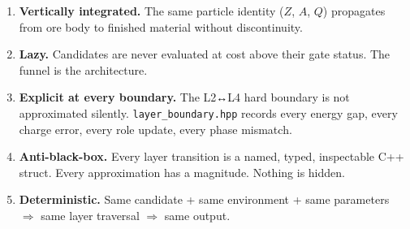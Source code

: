 \documentclass[11pt, a4paper, oneside]{article}
\theoremstyle{definition}
\newcommand{\file}[1]{\texttt{#1}}
\begin{document}
\begin{enumerate}
  \item \textbf{Vertically integrated.}
        The same particle identity ($Z$, $A$, $Q$) propagates from
        ore body to finished material without discontinuity.

  \item \textbf{Lazy.}
        Candidates are never evaluated at cost above their gate status.
        The funnel is the architecture.

  \item \textbf{Explicit at every boundary.}
        The L2↔L4 hard boundary is not approximated silently.
        \file{layer\_boundary.hpp} records every energy gap, every
        charge error, every role update, every phase mismatch.

  \item \textbf{Anti-black-box.}
        Every layer transition is a named, typed, inspectable C++ struct.
        Every approximation has a magnitude.  Nothing is hidden.

  \item \textbf{Deterministic.}
        Same candidate + same environment + same parameters
        $\Rightarrow$ same layer traversal $\Rightarrow$ same output.
\end{enumerate}
\end{document}
